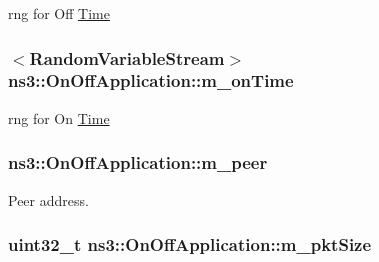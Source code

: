 rng for Off \hyperlink{classns3_1_1Time}{Time} 

\subsubsection[{\texorpdfstring{m\+\_\+on\+Time}{m_onTime}}]{$<${\bf Random\+Variable\+Stream}$>$ ns3\+::\+On\+Off\+Application\+::m\+\_\+on\+Time\hspace{0.3cm}{\ttfamily [private]}}\hypertarget{classns3_1_1OnOffApplication_ad09b299b329d726d30071006bf0496e8}{}\label{classns3_1_1OnOffApplication_ad09b299b329d726d30071006bf0496e8}


rng for On \hyperlink{classns3_1_1Time}{Time} 

\subsubsection[{\texorpdfstring{m\+\_\+peer}{m_peer}}]{ ns3\+::\+On\+Off\+Application\+::m\+\_\+peer\hspace{0.3cm}{\ttfamily [private]}}\hypertarget{classns3_1_1OnOffApplication_af68738cdff7818215c8e4cb0f8e5c9e9}{}\label{classns3_1_1OnOffApplication_af68738cdff7818215c8e4cb0f8e5c9e9}


Peer address. 

\subsubsection[{\texorpdfstring{m\+\_\+pkt\+Size}{m_pktSize}}]{\setlength{\rightskip}{0pt plus 5cm}uint32\+\_\+t ns3\+::\+On\+Off\+Application\+::m\+\_\+pkt\+Size\hspace{0.3cm}{\ttfamily [private]}}\hypertarget{classns3_1_1OnOffApplication_a245613852fed52486699a56f0a4984e6}{}\label{classns3_1_1OnOffApplication_a245613852fed52486699a56f0a4984e6}


